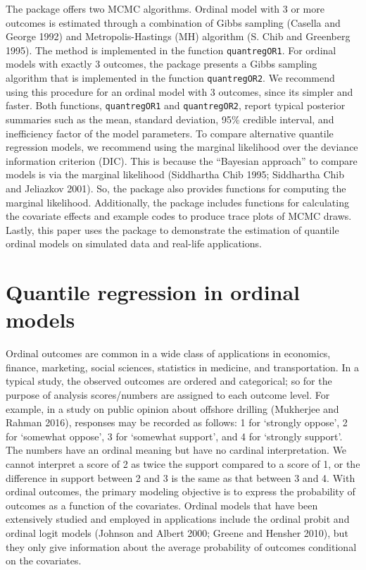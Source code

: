 The  package offers two MCMC algorithms. Ordinal model with 3 or more outcomes is estimated through a combination of Gibbs sampling (Casella and George 1992) and Metropolis-Hastings (MH) algorithm (S. Chib and Greenberg 1995). The method is implemented in the function \texttt{quantregOR1}. For ordinal models with exactly 3 outcomes, the package presents a Gibbs sampling algorithm that is implemented in the function \texttt{quantregOR2}. We recommend using this procedure for an ordinal model with 3 outcomes, since its simpler and faster. Both functions, \texttt{quantregOR1} and \texttt{quantregOR2}, report typical posterior summaries such as the mean, standard deviation, 95\% credible interval, and inefficiency factor of the model parameters. To compare alternative quantile regression models, we recommend using the marginal likelihood over the deviance information criterion (DIC). This is because the ``Bayesian approach'' to compare models is via the marginal likelihood (Siddhartha Chib 1995; Siddhartha Chib and Jeliazkov 2001). So, the  package also provides functions for computing the marginal likelihood. Additionally, the package includes functions for calculating the covariate effects and example codes to produce trace plots of MCMC draws. Lastly, this paper uses the  package to demonstrate the estimation of quantile ordinal models on simulated data and real-life applications.

\hypertarget{sec:QROrdinal}{%
\section{Quantile regression in ordinal models}\label{sec:QROrdinal}}

Ordinal outcomes are common in a wide class of applications in economics, finance, marketing, social sciences, statistics in medicine, and transportation. In a typical study, the observed outcomes are ordered and categorical; so for the purpose of analysis scores/numbers are assigned to each outcome level. For example, in a study on public opinion about offshore drilling (Mukherjee and Rahman 2016), responses may be recorded as follows: 1 for `strongly oppose', 2 for `somewhat oppose', 3 for `somewhat support', and 4 for `strongly support'. The numbers have an ordinal meaning but have no cardinal interpretation. We cannot interpret a score of 2 as twice the support compared to a score of 1, or the difference in support between 2 and 3 is the same as that between 3 and 4. With ordinal outcomes, the primary modeling objective is to express the probability of outcomes as a function of the covariates. Ordinal models that have been extensively studied and employed in applications include the ordinal probit and ordinal logit models (Johnson and Albert 2000; Greene and Hensher 2010), but they only give information about the average probability of outcomes conditional on the covariates.

